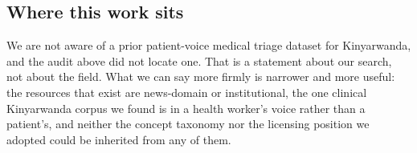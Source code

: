 \subsection{Where this work sits}

We are not aware of a prior patient-voice medical triage dataset for
Kinyarwanda, and the audit above did not locate one. That is a statement about
our search, not about the field. What we can say more firmly is narrower and
more useful: the resources that exist are news-domain or institutional, the one
clinical Kinyarwanda corpus we found is in a health worker's voice rather than a
patient's, and neither the concept taxonomy nor the licensing position we
adopted could be inherited from any of them.

%
%
%
